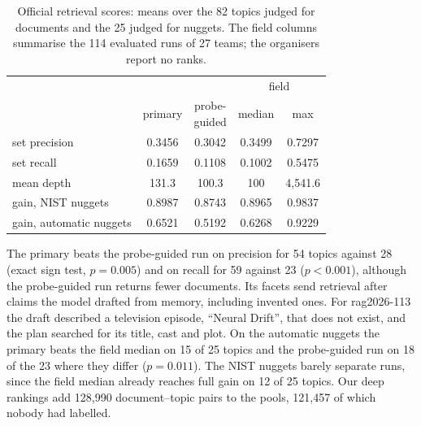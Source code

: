 \documentclass[sigconf,nonacm]{acmart}
\begin{document}
\begin{table}[t]
\caption{Official retrieval scores: means over the 82 topics judged for documents
and the 25 judged for nuggets. The field columns summarise the 114 evaluated runs of
27 teams; the organisers report no ranks.}
\label{tab:official}
\small
\setlength{\tabcolsep}{4.5pt}
\begin{tabular}{lcccc}
\toprule
 & & & \multicolumn{2}{c}{field} \\
\cmidrule(lr){4-5}
 & primary & \shortstack{probe-\\guided} & median & max \\
\midrule
set precision & 0.3456 & 0.3042 & 0.3499 & 0.7297 \\
set recall & 0.1659 & 0.1108 & 0.1002 & 0.5475 \\
mean depth & 131.3 & 100.3 & 100 & 4{,}541.6 \\
gain, NIST nuggets & 0.8987 & 0.8743 & 0.8965 & 0.9837 \\
gain, automatic nuggets & 0.6521 & 0.5192 & 0.6268 & 0.9229 \\
\bottomrule
\end{tabular}
\end{table}

The primary beats the probe-guided run on precision for 54 topics against 28
(exact sign test, $p = 0.005$) and on recall for 59 against 23 ($p < 0.001$),
although the probe-guided run returns fewer documents. Its facets send retrieval
after claims the model drafted from memory, including invented ones. For rag2026-113
the draft described a television episode, ``Neural Drift'', that does not exist,
and the plan searched for its title, cast and plot. On the automatic nuggets the
primary beats the field median on 15 of 25 topics and the probe-guided run on 18 of
the 23 where they differ ($p = 0.011$). The NIST nuggets barely separate runs, since
the field median already reaches full gain on 12 of 25 topics. Our deep rankings add
128,990 document--topic pairs to the pools, 121,457 of which nobody had labelled.
\end{document}
